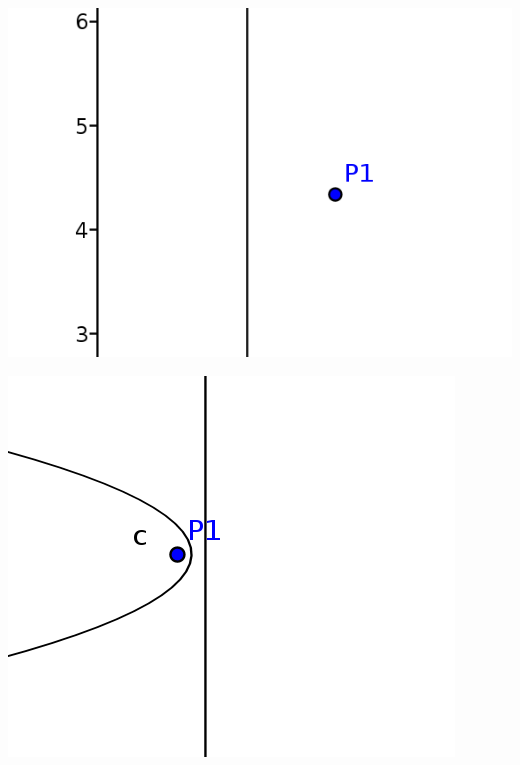 \begin{minipage}[t]{0.5\textwidth}
    \includegraphics[width=\textwidth]{images/sweep_line_01.png}
\label{fig:delaunayExample01Orig}
\end{minipage}
\begin{minipage}[t]{0.5\textwidth}
    \includegraphics[width=\textwidth]{images/sweep_line_02.png}
\label{fig:delaunayExample01500}
\end{minipage}


